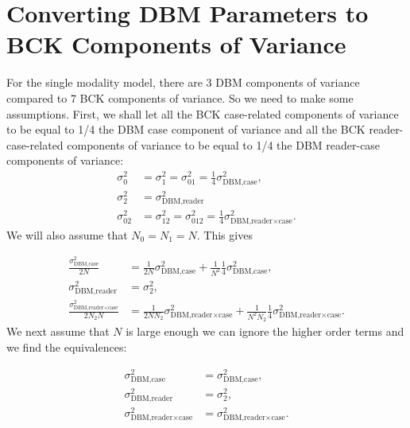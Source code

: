 \documentclass{article}%
\begin{document}
\section{Converting DBM Parameters to BCK Components of Variance}

For the single modality model, there are 3 DBM components of variance compared
to 7 BCK components of variance. So we need to make some assumptions. First,
we shall let all the BCK case-related components of variance to be equal to
1/4 the DBM case component of variance and all the BCK reader-case-related
components of variance to be equal to 1/4 the DBM reader-case components of
variance:%
\begin{align}
\sigma_{0}^{2}  &  =\sigma_{1}^{2}=\sigma_{01}^{2}=\frac{1}{4}\sigma
_{\text{DBM,case}}^{2},\\
\sigma_{2}^{2}  &  =\sigma_{\text{DBM,reader}}^{2}\\
\sigma_{02}^{2}  &  =\sigma_{12}^{2}=\sigma_{012}^{2}=\frac{1}{4}%
\sigma_{\text{DBM,reader}\times\text{case}}^{2}.
\end{align}
We will also assume that $N_{0}=N_{1}=N.$ This gives%

\begin{align}
\frac{\sigma_{\text{DBM,case}}^{2}}{2N}  &  =\frac{1}{2N}\sigma
_{\text{DBM,case}}^{2}+\frac{1}{N^{2}}\frac{1}{4}\sigma_{\text{DBM,case}}%
^{2},\\
\sigma_{\text{DBM,reader}}^{2}  &  =\sigma_{2}^{2},\\
\frac{\sigma_{\text{DBM,reader}\times\text{case}}^{2}}{2N_{2}N}  &  =\frac
{1}{2NN_{2}}\sigma_{\text{DBM,reader}\times\text{case}}^{2}+\frac{1}%
{N^{2}N_{2}}\frac{1}{4}\sigma_{\text{DBM,reader}\times\text{case}}^{2}.
\end{align}
We next assume that $N$ is large enough we can ignore the higher order terms
and we find the equivalences:%

\begin{align}
\sigma_{\text{DBM,case}}^{2}  &  =\sigma_{\text{DBM,case}}^{2},\\
\sigma_{\text{DBM,reader}}^{2}  &  =\sigma_{2}^{2},\\
\sigma_{\text{DBM,reader}\times\text{case}}^{2}  &  =\sigma_{\text{DBM,reader}%
\times\text{case}}^{2}.
\end{align}
\end{document}
